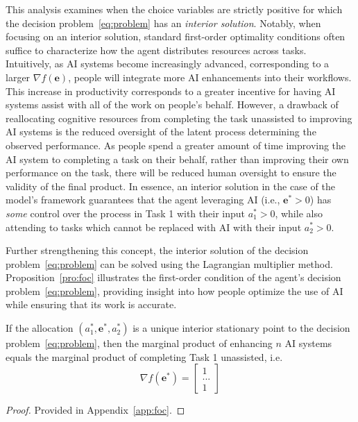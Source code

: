 This analysis examines when the choice variables are strictly positive for which the decision problem~\ref{eq:problem} has an \textit{interior solution}. Notably, when focusing on an interior solution, standard first-order optimality conditions often suffice to characterize how the agent distributes resources across tasks. Intuitively, as AI systems become increasingly advanced, corresponding to a larger $\nabla f(\mathbf{e})$, people will integrate more AI enhancements into their workflows. This increase in productivity corresponds to a greater incentive for having AI systems assist with all of the work on people's behalf. However, a drawback of reallocating cognitive resources from completing the task unassisted to improving AI systems is the reduced oversight of the latent process determining the observed performance. As people spend a greater amount of time improving the AI system to completing a task on their behalf, rather than improving their own performance on the task, there will be reduced human oversight to ensure the validity of the final product. In essence, an interior solution in the case of the model's framework guarantees that the agent leveraging AI (i.e., $\mathbf{e}^*>0$) has \textit{some} control over the process in Task 1 with their input $a_1^*>0$, while also attending to tasks which cannot be replaced with AI with their input $a^*_2>0$.

Further strengthening this concept, the interior solution of the decision problem~\ref{eq:problem} can be solved using the Lagrangian multiplier method. Proposition~\ref{pro:foc} illustrates the first-order condition of the agent's decision problem~\ref{eq:problem}, providing insight into how people optimize the use of AI while ensuring that its work is accurate.

\begin{proposition}
\label{pro:foc}
If the allocation $(a^*_1,\mathbf{e}^*,a^*_2)$ is a unique interior stationary point to the decision problem~\ref{eq:problem}, then the marginal product of enhancing $n$ AI systems equals the marginal product of completing Task 1 unassisted, i.e.
$$\nabla f(\mathbf{e}^*)=\begin{bmatrix}
1\\
...\\
1
\end{bmatrix}$$
\end{proposition}
\begin{proof}
Provided in Appendix~\ref{app:foc}.
\end{proof}


